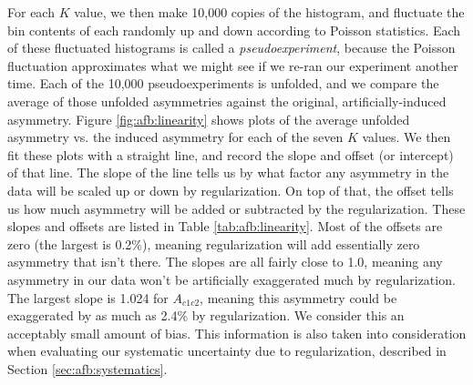 For each $K$ value, we then make 10,000 copies of the histogram, and
fluctuate the bin contents of each randomly up and down according to
Poisson statistics. Each of these fluctuated histograms is called a
\emph{pseudoexperiment}, because the Poisson fluctuation approximates
what we might see if we re-ran our experiment another time. Each of
the 10,000 pseudoexperiments is unfolded, and we compare the average
of those unfolded asymmetries against the original,
artificially-induced asymmetry. Figure \ref{fig:afb:linearity}
shows plots of the average unfolded asymmetry vs. the induced asymmetry
for each of the seven $K$ values. We then fit these plots
with a straight line, and record the slope and offset
(or intercept) of that line. The slope of the line tells us by what
factor any asymmetry in the data will be scaled up or down by
regularization. On top of that, the offset tells us how much asymmetry
will be added or subtracted by the regularization. These slopes and
offsets are listed in Table \ref{tab:afb:linearity}. Most of the offsets are
zero (the largest is 0.2\%), meaning regularization will add
essentially zero asymmetry that isn't there. The slopes are all fairly
close to 1.0, meaning any asymmetry in our data won't be artificially
exaggerated much by regularization. The largest slope is 1.024 for
$A_{c1c2}$, meaning this asymmetry could be exaggerated by as much as
2.4\% by regularization. We consider this an acceptably small amount
of bias. This information is also taken into consideration when
evaluating our systematic uncertainty due to regularization, described
in Section \ref{sec:afb:systematics}.

